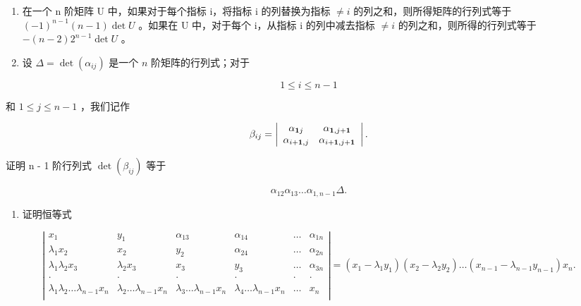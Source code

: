 \BourbakiExercisesSection

\begin{enumerate}
\def\labelenumi{\arabic{enumi}.}
\item
  在一个 n 阶矩阵 U 中，如果对于每个指标 i，将指标 i 的列替换为指标 \(\neq i\) 的列之和，则所得矩阵的行列式等于 \((-1)^{n-1}(n-1)\det U\) 。如果在 U 中，对于每个 i，从指标 i 的列中减去指标 \(\neq i\) 的列之和，则所得的行列式等于 \(-(n-2)2^{n-1}\det U\) 。
\item
  设 \(\Delta = \det (\alpha_{ij})\) 是一个 \(n\) 阶矩阵的行列式；对于
\end{enumerate}

\[
1 \leqslant i \leqslant n - 1
\]

和 \(1 \leqslant j \leqslant n - 1\) ，我们记作

\[
\beta_ {i j} = \left| \begin{array}{c c} \alpha_ {\mathbf {1} j} & \alpha_ {\mathbf {1}, j + \mathbf {1}} \\ \alpha_ {i + \mathbf {1}, j} & \alpha_ {i + \mathbf {1}, j + \mathbf {1}} \end{array} \right|.
\]

证明 n - 1 阶行列式 \(\det(\beta_{ij})\) 等于

\[
\alpha_ {1 2} \alpha_ {1 3} \dots \alpha_ {1, n - 1} \Delta .
\]

\begin{enumerate}
\def\labelenumi{\arabic{enumi}.}
\setcounter{enumi}{2}
\tightlist
\item
  证明恒等式
\end{enumerate}

\[
\left| \begin{array}{cccccc} x _ {1} & y _ {1} & \alpha_ {1 3} & \alpha_ {1 4} & \ldots & \alpha_ {1 n} \\ \lambda_ {1} x _ {2} & x _ {2} & y _ {2} & \alpha_ {2 4} & \ldots & \alpha_ {2 n} \\ \lambda_ {1} \lambda_ {2} x _ {3} & \lambda_ {2} x _ {3} & x _ {3} & y _ {3} & \ldots & \alpha_ {3 n} \\ \cdot & \cdot & \cdot & \cdot & \cdot & \cdot \\ \lambda_ {1} \lambda_ {2} \ldots \lambda_ {n - 1} x _ {n} & \lambda_ {2} \ldots \lambda_ {n - 1} x _ {n} & \lambda_ {3} \ldots \lambda_ {n - 1} x _ {n} & \lambda_ {4} \ldots \lambda_ {n - 1} x _ {n} & \ldots & x _ {n} \\ \end{array} \right| = (x _ {1} - \lambda_ {1} y _ {1}) (x _ {2} - \lambda_ {2} y _ {2}) \ldots (x _ {n - 1} - \lambda_ {n - 1} y _ {n - 1}) x _ {n}.
\]

